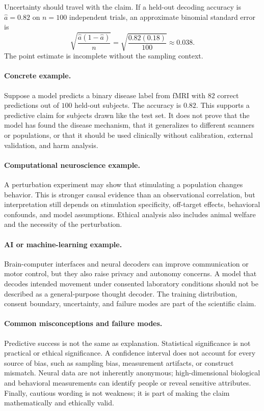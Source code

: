 Uncertainty should travel with the claim. If a held-out decoding accuracy is \(\widehat a=0.82\) on \(n=100\) independent trials, an approximate binomial standard error is
\[
\sqrt{\frac{\widehat a(1-\widehat a)}{n}}
=\sqrt{\frac{0.82(0.18)}{100}}
\approx0.038.
\]
The point estimate is incomplete without the sampling context.

\paragraph{Concrete example.}
Suppose a model predicts a binary disease label from fMRI with \(82\) correct predictions out of \(100\) held-out subjects. The accuracy is \(0.82\). This supports a predictive claim for subjects drawn like the test set. It does not prove that the model has found the disease mechanism, that it generalizes to different scanners or populations, or that it should be used clinically without calibration, external validation, and harm analysis.

\paragraph{Computational neuroscience example.}
A perturbation experiment may show that stimulating a population changes behavior. This is stronger causal evidence than an observational correlation, but interpretation still depends on stimulation specificity, off-target effects, behavioral confounds, and model assumptions. Ethical analysis also includes animal welfare and the necessity of the perturbation.

\paragraph{AI or machine-learning example.}
Brain-computer interfaces and neural decoders can improve communication or motor control, but they also raise privacy and autonomy concerns. A model that decodes intended movement under consented laboratory conditions should not be described as a general-purpose thought decoder. The training distribution, consent boundary, uncertainty, and failure modes are part of the scientific claim.

\paragraph{Common misconceptions and failure modes.}
Predictive success is not the same as explanation. Statistical significance is not practical or ethical significance. A confidence interval does not account for every source of bias, such as sampling bias, measurement artifacts, or construct mismatch. Neural data are not inherently anonymous; high-dimensional biological and behavioral measurements can identify people or reveal sensitive attributes. Finally, cautious wording is not weakness; it is part of making the claim mathematically and ethically valid.

